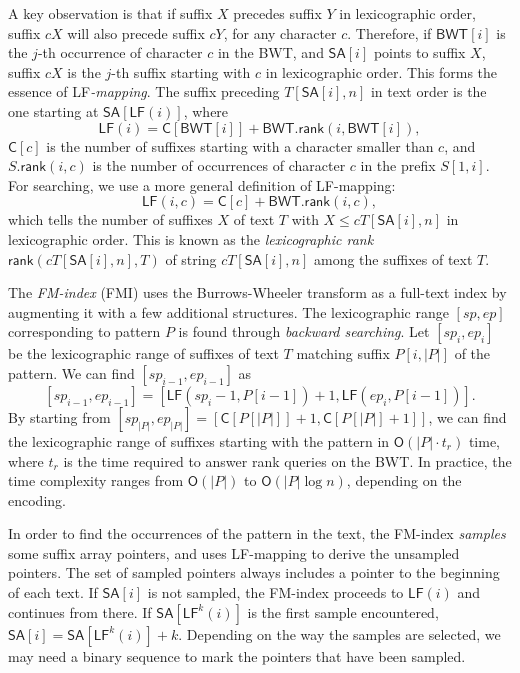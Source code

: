 \documentclass[smallabstract,smallcaptions]{dccpaper}
\newcommand{\abs}[1]{\ensuremath{\lvert #1 \rvert}}
\newcommand{\Oh}{\ensuremath{\mathsf{O}}}
\newcommand{\BWT}{\textsf{BWT}}
\newcommand{\FMI}{\textsf{FMI}}
\newcommand{\mSA}{\ensuremath{\mathsf{SA}}}
\newcommand{\mBWT}{\ensuremath{\mathsf{BWT}}}
\newcommand{\mC}{\ensuremath{\mathsf{C}}}
\newcommand{\LF}{\textsf{LF}}
\newcommand{\rank}{\textsf{rank}}
\newcommand{\mLF}{\ensuremath{\mathsf{LF}}}
\newcommand{\mrank}{\ensuremath{\mathsf{rank}}}
\begin{document}
A key observation is that if suffix $X$ precedes suffix $Y$ in lexicographic order, suffix $cX$ will also precede suffix $cY$, for any character $c$. Therefore, if $\mBWT[i]$ is the $j$\nobreakdash-th occurrence of character $c$ in the \BWT, and $\mSA[i]$ points to suffix $X$, suffix $cX$ is the $j$\nobreakdash-th suffix starting with $c$ in lexicographic order. This forms the essence of \LF\emph{\nobreakdash-mapping}. The suffix preceding $T[\mSA[i],n]$ in text order is the one starting at $\mSA[\mLF(i)]$, where
$$
\mLF(i) = \mC[\mBWT[i]] + \mBWT.\mrank(i, \mBWT[i]),
$$
$\mC[c]$ is the number of suffixes starting with a character smaller than $c$, and $S.\mrank(i,c)$ is the number of occurrences of character $c$ in the prefix $S[1,i]$. For searching, we use a more general definition of \LF\nobreakdash-mapping:
$$
\mLF(i,c) = \mC[c] + \mBWT.\mrank(i, c),
$$
which tells the number of suffixes $X$ of text $T$ with $X \le c T[\mSA[i],n]$ in lexicographic order. This is known as the \emph{lexicographic rank} $\mrank(cT[\mSA[i],n], T)$ of string $cT[\mSA[i],n]$ among the suffixes of text $T$.

The \emph{FM-index} (\FMI) \cite{Ferragina2005a} uses the Burrows-Wheeler transform as a full-text index by augmenting it with a few additional structures. The lexicographic range $[sp,ep]$ corresponding to pattern $P$ is found through \emph{backward searching}. Let $[sp_{i},ep_{i}]$ be the lexicographic range of suffixes of text $T$ matching suffix $P[i, \abs{P}]$ of the pattern. We can find $[sp_{i-1},ep_{i-1}]$ as
$$
[sp_{i-1},ep_{i-1}] = [\mLF(sp_{i}-1, P[i-1]) + 1, \mLF(ep_{i}, P[i-1])].
$$
By starting from $[sp_{\abs{P}}, ep_{\abs{P}}] = [\mC[P[\abs{P}]]+1, \mC[P[\abs{P}]+1]]$, we can find the lexicographic range of suffixes starting with the pattern in $\Oh(\abs{P} \cdot t_{r})$ time, where $t_{r}$ is the time required to answer \rank{} queries on the \BWT. In practice, the time complexity ranges from $\Oh(\abs{P})$ to $\Oh(\abs{P} \log n)$, depending on the encoding.

In order to find the occurrences of the pattern in the text, the FM-index \emph{samples} some suffix array pointers, and uses \LF\nobreakdash-mapping to derive the unsampled pointers. The set of sampled pointers always includes a pointer to the beginning of each text. If $\mSA[i]$ is not sampled, the FM-index proceeds to $\mLF(i)$ and continues from there. If $\mSA[\mLF^{k}(i)]$ is the first sample encountered, $\mSA[i] = \mSA[\mLF^{k}(i)] + k$. Depending on the way the samples are selected, we may need a binary sequence to mark the pointers that have been sampled.
\end{document}
